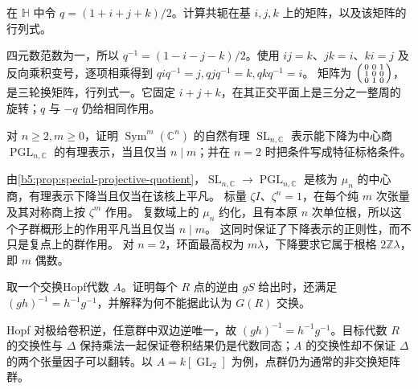 \begin{optionalexercise}\label{b5:ex:21:20}
	在 \(\mathbb H\) 中令 \(q=(1+i+j+k)/2\)。计算共轭在基 \(i,j,k\) 上的矩阵，以及该矩阵的行列式。
\end{optionalexercise}
\begin{solution}
	四元数范数为一，所以 \(q^{-1}=(1-i-j-k)/2\)。使用 \(ij=k\)、\(jk=i\)、\(ki=j\) 及反向乘积变号，逐项相乘得到 \(qiq^{-1}=j,qjq^{-1}=k,qkq^{-1}=i\)。
	矩阵为 \(\begin{psmallmatrix}0&0&1\\1&0&0\\0&1&0\end{psmallmatrix}\)，是三轮换矩阵，行列式一。它固定 \(i+j+k\)，在其正交平面上是三分之一整周的旋转；\(q\) 与 \(-q\) 仍给相同作用。
\end{solution}

\begin{optionalexercise}\label{b5:ex:21:21}
	对 \(n\ge2,m\ge0\)，证明 \(\operatorname{Sym}^m(\mathbb C^n)\) 的自然有理 \(\operatorname{SL}_{n,\mathbb C}\) 表示能下降为中心商 \(\operatorname{PGL}_{n,\mathbb C}\) 的有理表示，当且仅当 \(n\mid m\)；并在 \(n=2\) 时把条件写成特征标格条件。
\end{optionalexercise}
\begin{solution}
	由\cref{b5:prop:special-projective-quotient}，\(\operatorname{SL}_{n,\mathbb C}\to\operatorname{PGL}_{n,\mathbb C}\) 是核为 \(\mu_n\) 的中心商，有理表示下降当且仅当在该核上平凡。 标量 \(\zeta I\)、\(\zeta^n=1\)，在每个纯 \(m\) 次张量及其对称商上按 \(\zeta^m\) 作用。 复数域上的 \(\mu_n\) 约化，且有本原 \(n\) 次单位根，所以这个子群概形上的作用平凡当且仅当 \(n\mid m\)。 这同时保证了下降表示的正则性，而不只是复点上的群作用。 对 \(n=2\)，环面最高权为 \(m\lambda\)，下降要求它属于根格 \(2\mathbb Z\lambda\)，即 \(m\) 偶数。
\end{solution}

\begin{optionalexercise}\label{b5:ex:21:22}
	取一个交换Hopf代数 \(A\)。证明每个 \(R\) 点的逆由 \(gS\) 给出时，还满足 \((gh)^{-1}=h^{-1}g^{-1}\)，并解释为何不能据此认为 \(G(R)\) 交换。
\end{optionalexercise}
\begin{solution}
	Hopf 对极给卷积逆，任意群中双边逆唯一，故 \((gh)^{-1}=h^{-1}g^{-1}\)。目标代数 \(R\) 的交换性与 \(\Delta\) 保持乘法一起保证卷积结果仍是代数同态；\(A\) 的交换性却不保证 \(\Delta\) 的两个张量因子可以翻转。以 \(A=k[\operatorname{GL}_2]\) 为例，点群仍为通常的非交换矩阵群。
\end{solution}
